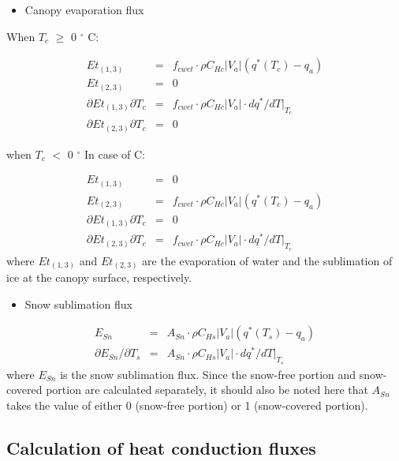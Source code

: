 \begin{itemize}
\tightlist
\item
  Canopy evaporation flux
\end{itemize}

When \(T_c\) \(\geq\) 0 \(^{\circ}\) C:

\begin{eqnarray}
 Et_{(1,3)} &=&
  f_{cwet} \cdot \rho C_{Hc}|V_a|(q^\ast(T_c) - q_a) \\
 Et_{(2,3)} &=& 0 \\
 \partial Et_{(1,3)} \partial T_c &=&
  f_{cwet} \cdot \rho C_{Hc}|V_a|\cdot dq^\ast/dT|_{T_c} \\
 \partial Et_{(2,3)} \partial T_c &=& 0
\end{eqnarray}

when \(T_c\) \(<\) 0 \(^{\circ}\) In case of C:

\begin{eqnarray}
 Et_{(1,3)} &=& 0 \\
 Et_{(2,3)} &=&
  f_{cwet} \cdot \rho C_{Hc}|V_a|(q^\ast(T_c) - q_a) \\
 \partial Et_{(1,3)} \partial T_c &=& 0 \\
 \partial Et_{(2,3)} \partial T_c &=&
  f_{cwet} \cdot \rho C_{Hc}|V_a|\cdot dq^\ast/dT|_{T_c}
\end{eqnarray} where \(Et_{(1,3)}\) and \(Et_{(2,3)}\) are the evaporation of water and the sublimation of ice at the canopy surface, respectively.

\begin{itemize}
\tightlist
\item
  Snow sublimation flux
\end{itemize}

\begin{eqnarray}
 E_{Sn} &=& A_{Sn}\cdot \rho C_{Hs}|V_a|(q^\ast(T_s) - q_a) \\
 \partial E_{Sn}/\partial T_s &=& A_{Sn}\cdot \rho C_{Hs}|V_a|
 \cdot dq^\ast/dT|_{T_s}
\end{eqnarray} where \(E_{Sn}\) is the snow sublimation flux. Since the snow-free portion and snow-covered portion are calculated separately, it should also be noted here that \(A_{Sn}\) takes the value of either
0 (snow-free portion) or 1 (snow-covered portion).

\hypertarget{calculation-of-heat-conduction-fluxes}{%
\subsection{Calculation of heat conduction fluxes}\label{calculation-of-heat-conduction-fluxes}}

